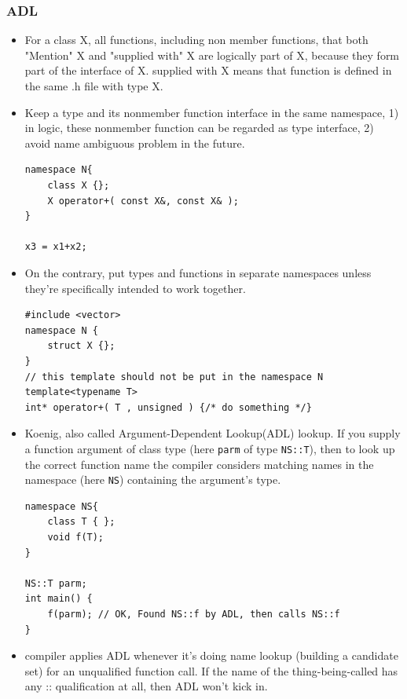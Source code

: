 \documentclass[a4paper,11pt,twoside]{book}
\begin{document}
\subsubsection{ADL}
\begin{itemize}
	\item For a class X, all functions, including non member functions, that both "Mention" X and "supplied with" X are logically part of X, because they form part of the interface of X. supplied with X means that function is defined in the same .h file with type X. 
	
	\item Keep a type and its nonmember function interface in the same namespace, 1) in logic, these nonmember function can be regarded as type interface, 2) avoid name ambiguous problem in the future.
\begin{lstlisting}[numbers=none]
namespace N{
	class X {};
	X operator+( const X&, const X& );
}

x3 = x1+x2;	
\end{lstlisting}	
	
	\item On the contrary, put types and functions in separate namespaces unless they're specifically intended to work together.
	
\begin{lstlisting}[numbers=none]
#include <vector>
namespace N {
	struct X {};
}
// this template should not be put in the namespace N
template<typename T>
int* operator+( T , unsigned ) {/* do something */}	
\end{lstlisting}	
		
	\item Koenig, also called Argument-Dependent Lookup(ADL) lookup. If you supply a function argument of class type (here \texttt{parm} of type \texttt{NS::T}), then to look up the correct function name the compiler considers matching names in the namespace (here \texttt{NS}) containing the argument's type.
	
\begin{lstlisting}[numbers=none]
namespace NS{
	class T { };
	void f(T);
}
	
NS::T parm;
int main() {
	f(parm); // OK, Found NS::f by ADL, then calls NS::f
}
\end{lstlisting}

\item compiler applies ADL whenever it's doing name lookup (building a candidate set) for an unqualified function call. If the name of the thing-being-called has any :: qualification at all, then ADL won't kick in.


\end{itemize}
\end{document}
